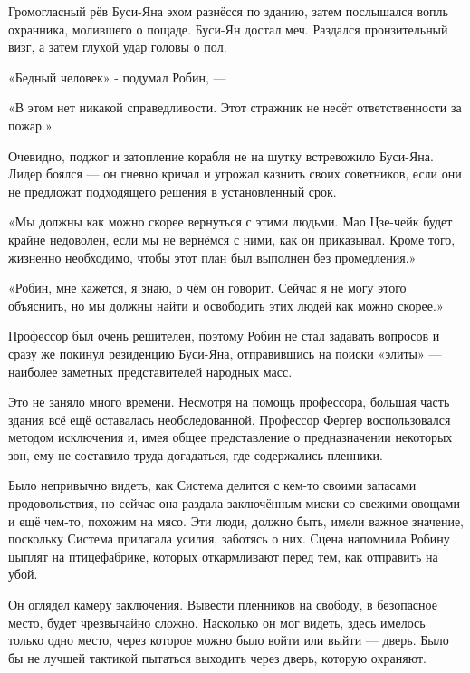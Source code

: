 \documentclass[a4paper,12pt]{book}
\begin{document}
\par
Громогласный рёв Буси-Яна эхом разнёсся по зданию, затем послышался вопль охранника, молившего о пощаде. Буси-Ян достал меч. Раздался пронзительный визг, а затем глухой удар головы о пол.\\
\par
«Бедный человек» - подумал Робин, —
\par
«В этом нет никакой справедливости. Этот стражник не несёт ответственности за пожар.»\\
\par
Очевидно, поджог и затопление корабля не на шутку встревожило Буси-Яна. Лидер боялся — он гневно кричал и угрожал казнить своих советников, если они не предложат подходящего решения в установленный срок.
\par
«Мы должны как можно скорее вернуться с этими людьми. Мао Цзе-чейк будет крайне недоволен, если мы не вернёмся с ними, как он приказывал. Кроме того, жизненно необходимо, чтобы этот план был выполнен без промедления.»\\
\par
«Робин, мне кажется, я знаю, о чём он говорит. Сейчас я не могу этого объяснить, но мы должны найти и освободить этих людей как можно скорее.»
\par
Профессор был очень решителен, поэтому Робин не стал задавать вопросов и сразу же покинул резиденцию Буси-Яна, отправившись на поиски «элиты» — наиболее заметных представителей народных масс.
\par
Это не заняло много времени. Несмотря на помощь профессора, большая часть здания всё ещё оставалась необследованной. Профессор Фергер воспользовался методом исключения и, имея общее представление о предназначении некоторых зон, ему не составило труда догадаться, где содержались пленники.
\par
Было непривычно видеть, как Система делится с кем-то своими запасами продовольствия, но сейчас она раздала заключённым миски со свежими овощами и ещё чем-то, похожим на мясо. Эти люди, должно быть, имели важное значение, поскольку Система прилагала усилия, заботясь о них. Сцена напомнила Робину цыплят на птицефабрике, которых откармливают перед тем, как отправить на убой.
\par
Он оглядел камеру заключения. Вывести пленников на свободу, в безопасное место, будет чрезвычайно сложно. Насколько он мог видеть, здесь имелось только одно место, через которое можно было войти или выйти — дверь. Было бы не лучшей тактикой пытаться выходить через дверь, которую охраняют.
\par
\end{document}
